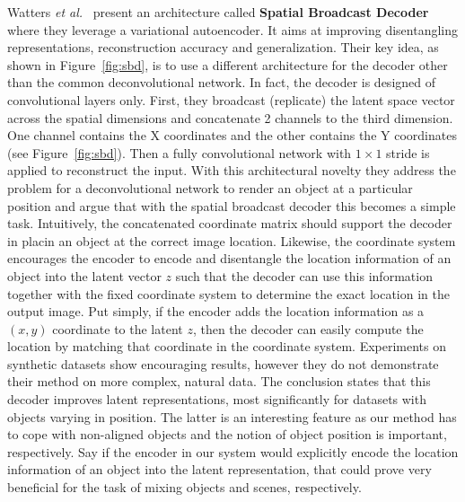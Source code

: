 \documentclass[a4paper,12pt]{report}
\begin{document}
\par Watters \textit{et al.}~\cite{SpatialBDecoder} present an architecture called \textbf{Spatial Broadcast Decoder} where they leverage a variational autoencoder. It aims at improving disentangling representations, reconstruction accuracy and generalization. Their key idea, as shown in Figure~\ref{fig:sbd}, is to use a different architecture for the decoder other than the common deconvolutional network. In fact, the decoder is designed of convolutional layers only. First, they broadcast (replicate) the latent space vector across the spatial dimensions and concatenate 2 channels to the third dimension. One channel contains the X coordinates and the other contains the Y coordinates (see Figure~\ref{fig:sbd}). Then a fully convolutional network with $1 \times 1$ stride is applied to reconstruct the input. With this architectural novelty they address the problem for a deconvolutional network to render an object at a particular position and argue that with the spatial broadcast decoder this becomes a simple task. Intuitively, the concatenated coordinate matrix should support the decoder in placin an object at the correct image location. Likewise, the coordinate system encourages the encoder to encode and disentangle the location information of an object into the latent vector $z$ such that the decoder can use this information together with the fixed coordinate system to determine the exact location in the output image. Put simply, if the encoder adds the location information as a $(x,y)$ coordinate to the latent $z$, then the decoder can easily compute the location by matching that coordinate in the coordinate system. Experiments on synthetic datasets show encouraging results, however they do not demonstrate their method on more complex, natural data. The conclusion states that this decoder improves latent representations, most significantly for datasets with objects varying in position. The latter is an interesting feature as our method has to cope with non-aligned objects and the notion of object position is important, respectively. Say if the encoder in our system would explicitly encode the location information of an object into the latent representation, that could prove very beneficial for the task of mixing objects and scenes, respectively.
\end{document}

